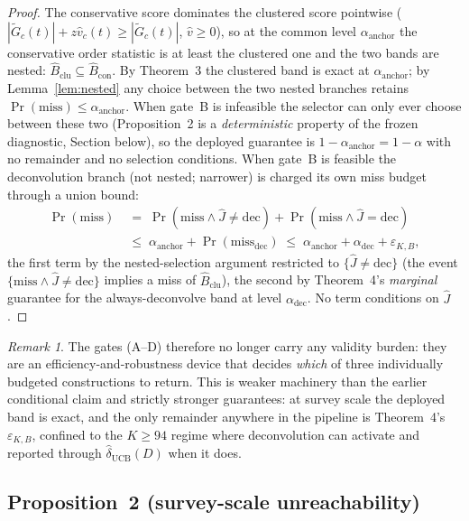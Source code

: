 \documentclass[12pt]{article}
\theoremstyle{definition}
\theoremstyle{remark}
\newtheorem{remark}{Remark}
\newcommand{\Gtilde}{\widetilde{G}}
\begin{document}
\begin{proof}
The conservative score dominates the clustered score pointwise
($|\Gtilde_c(t)|+z\widehat v_c(t)\ge|\Gtilde_c(t)|$, $\widehat v\ge0$), so at the common level
$\alpha_{\text{anchor}}$ the conservative order statistic is at least the clustered one and
the two bands are nested: $\widehat B_{\text{clu}}\subseteq\widehat B_{\text{con}}$.
By Theorem~3 the clustered band is exact at $\alpha_{\text{anchor}}$; by
Lemma~\ref{lem:nested} any choice between the two nested branches retains
$\Pr(\text{miss})\le\alpha_{\text{anchor}}$. When gate~B is infeasible the selector can
only ever choose between these two (Proposition~2 is a \emph{deterministic} property of
the frozen diagnostic, Section below), so the deployed guarantee is
$1-\alpha_{\text{anchor}}=1-\alpha$ with no remainder and no selection conditions. When
gate~B is feasible the deconvolution branch (not nested; narrower) is charged its own
miss budget through a union bound:
\begin{align*}
\Pr(\text{miss})\;&=\;\Pr(\text{miss}\wedge\widehat J\ne\text{dec})
+\Pr(\text{miss}\wedge\widehat J=\text{dec})\\
&\le\;\alpha_{\text{anchor}}+\Pr(\text{miss}_{\text{dec}})
\;\le\;\alpha_{\text{anchor}}+\alpha_{\text{dec}}+\varepsilon_{K,B},
\end{align*}
the first term by the nested-selection argument restricted to
$\{\widehat J\ne\text{dec}\}$ (the event $\{\text{miss}\wedge\widehat J\ne\text{dec}\}$
implies a miss of $\widehat B_{\text{clu}}$), the second by Theorem~4's
\emph{marginal} guarantee for the always-deconvolve band at level
$\alpha_{\text{dec}}$. No term conditions on $\widehat J$.
\end{proof}

\begin{remark}
The gates (A--D) therefore no longer carry any validity burden: they are an
efficiency-and-robustness device that decides \emph{which} of three individually
budgeted constructions to return. This is weaker machinery than the earlier
conditional claim and strictly stronger guarantees: at survey scale the deployed band
is exact, and the only remainder anywhere in the pipeline is Theorem~4's
$\varepsilon_{K,B}$, confined to the $K\ge94$ regime where deconvolution can activate
and reported through $\widehat\delta_{\text{UCB}}(D)$ when it does.
\end{remark}

\subsection{Proposition~2 (survey-scale unreachability)}
\end{document}

